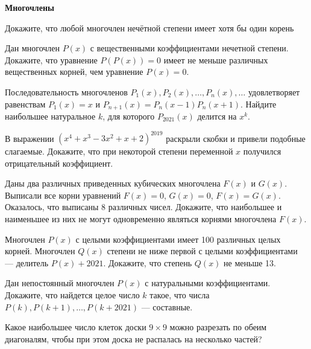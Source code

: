\documentclass{article}
\begin{document}
    \large

    \begin{center}
        \textbf{Многочлены}
    \end{center}

    \begin{enumerate_boxed}

        \item Докажите, что любой многочлен нечётной степени имеет хотя бы один корень

        \item Дан многочлен $P(x)$ с вещественными коэффициентами нечетной степени.
        Докажите, что уравнение $P(P(x)) = 0$ имеет не меньше различных вещественных корней, чем уравнение $P(x) = 0$.

        \item Последовательность многочленов $P_1(x), P_2(x), \ldots, P_n(x), \ldots$ удовлетворяет равенствам $P_1(x) = x$ и $P_{n+1}(x) = P_n(x - 1)P_n(x + 1)$.
        Найдите наибольшее натуральное $k$, для которого $P_{2021}(x)$ делится на $x^k$.

        \item В выражении $(x^4 + x^3 - 3x^2 + x + 2)^{2019}$ раскрыли скобки и привели подобные слагаемые.
        Докажите, что при некоторой степени переменной $x$ получился отрицательный коэффициент.

        \item Даны два различных приведенных кубических многочлена $F(x)$ и $G(x)$.
        Выписали все корни уравнений $F(x) = 0$, $G(x) = 0$, $F(x) = G(x)$.
        Оказалось, что выписаны 8 различных чисел.
        Докажите, что наибольшее и наименьшее из них не могут одновременно являться корнями многочлена $F(x)$.

        \item Многочлен $P(x)$ с целыми коэффициентами имеет 100 различных целых корней.
        Многочлен $Q(x)$ степени не ниже первой с целыми коэффициентами — делитель $P(x) + 2021$.
        Докажите, что степень $Q(x)$ не меньше 13.

        \item Дан непостоянный многочлен $P(x)$ с натуральными коэффициентами.
        Докажите, что найдется целое число $k$ такое, что числа $P(k), P(k+1), \ldots, P(k+2021)$ — составные.

        \item Какое наибольшее число клеток доски $9 \times 9$ можно разрезать по обеим диагоналям, чтобы при этом
        доска не распалась на несколько частей?

    \end{enumerate_boxed}
\end{document}
